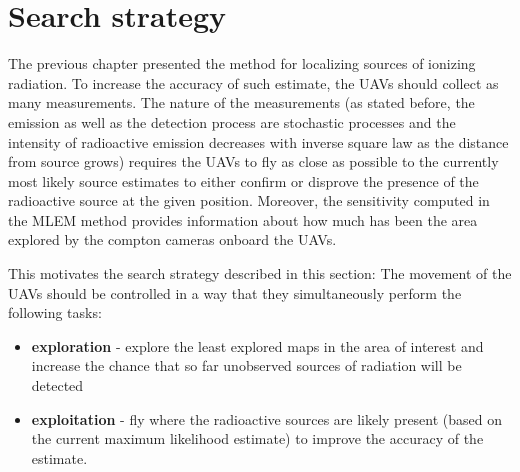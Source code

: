 
\chapter{Search strategy}
The previous chapter presented the method for localizing sources of ionizing radiation.
To increase the accuracy of such estimate, the \ac{UAV}s should collect as many measurements.
The nature of the measurements (as stated before, the emission as well as the detection process are stochastic processes and the intensity of radioactive emission decreases with inverse square law as the distance from source grows) 
requires the \ac{UAV}s to fly as close as possible to the currently most likely source estimates to either confirm or disprove the presence of the radioactive source at the given position.
Moreover, the sensitivity computed in the \ac{MLEM} method provides information about how much has been the area explored by the compton cameras onboard the \ac{UAV}s.

This motivates the search strategy described in this section:
The movement of the \ac{UAV}s should be controlled in a way that they simultaneously perform the following tasks:
\begin{itemize}
  \item \textbf{exploration} - explore the least explored maps in the area of interest and increase the chance that so far unobserved sources of radiation will be detected
  \item \textbf{exploitation} - fly where the radioactive sources are likely present (based on the current maximum likelihood estimate) to improve the accuracy of the estimate. 
\end{itemize}






